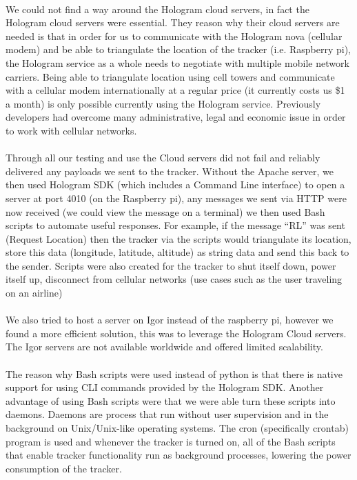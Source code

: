 \documentclass[12pt,a4paper]{article}
\begin{document}
        \paragraph{} We could not find a way around the Hologram cloud servers, in fact the Hologram cloud servers were essential. They reason why their cloud servers are needed is that in order for us to communicate with the Hologram nova (cellular modem) and be able to triangulate the location of the tracker (i.e. Raspberry pi), the Hologram service as a whole needs to negotiate with multiple mobile network carriers. Being able to triangulate location using cell towers and communicate with a cellular modem internationally at a regular price (it currently costs us \$1 a month) is only possible currently using the Hologram service. Previously developers had overcome many administrative, legal and economic issue in order to work with cellular networks.  
        
        \paragraph{} Through all our testing and use the Cloud servers did not fail and reliably delivered any payloads we sent to the tracker. Without the Apache server, we then used Hologram SDK (which includes a Command Line interface) to open a server at port 4010 (on the Raspberry pi), any messages we sent via HTTP were now received (we could view the message on a terminal) we then used Bash scripts to automate useful responses. For example, if the message “RL” was sent (Request Location) then the tracker via the scripts would triangulate its location, store this data (longitude, latitude, altitude) as string data and send this back to the sender. Scripts were also created for the tracker to shut itself down, power itself up, disconnect from cellular networks (use cases such as the user traveling on an airline)
        
        \paragraph{} We also tried to host a server on Igor instead of the raspberry pi, however we found a more efficient solution, this was to leverage the Hologram Cloud servers. The Igor servers are not available worldwide and offered limited scalability. 
        
        \paragraph{} The reason why Bash scripts were used instead of python is that there is native support for using CLI commands provided by the Hologram SDK. Another advantage of using Bash scripts were that we were able turn these scripts into daemons. Daemons are process that run without user supervision and in the background on Unix/Unix-like operating systems. The cron (specifically crontab) program is used and whenever the tracker is turned on, all of the Bash scripts that enable tracker functionality run as background processes, lowering the power consumption of the tracker.
        
\end{document}
